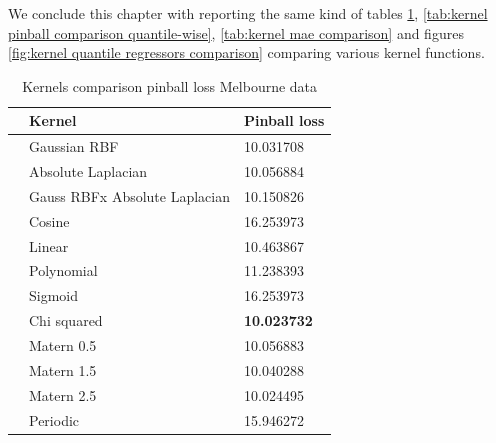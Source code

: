 We conclude this chapter with reporting the same kind of tables \ref{tab:kernel pinball comparison}, \ref{tab:kernel pinball comparison quantile-wise}, \ref{tab:kernel mae comparison} and figures \ref{fig:kernel quantile regressors comparison} comparing various kernel functions.

\begin{table}[!h]
    \caption{Kernels comparison pinball loss Melbourne data}
    \label{tab:kernel pinball comparison}
    \begin{center}
    \begin{tabular}{lll}
        \toprule
        & Kernel & Pinball loss
        \\
        \midrule
        & Gaussian RBF &  10.031708 \\
        & Absolute Laplacian &  10.056884 \\
        & Gauss RBFx Absolute Laplacian & 10.150826 \\
        & Cosine & 16.253973    \\
        & Linear & 10.463867    \\
        & Polynomial & 11.238393     \\
        & Sigmoid & 16.253973            \\
        & Chi squared & \textbf{10.023732}       \\
        & Matern 0.5 & 10.056883  \\
        & Matern 1.5 & 10.040288  \\
        & Matern 2.5 & 10.024495    \\
        & Periodic  & 15.946272\\
        \bottomrule
        \end{tabular}
    \end{center}
    \end{table}
    
